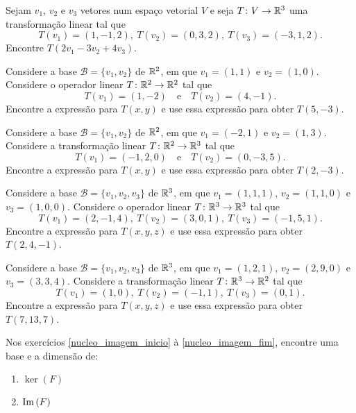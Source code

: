 \documentclass[12pt]{exam}
\begin{document}
\begin{exercicio}
    Sejam $v_1$, $v_2$ e $v_3$ vetores num espaço vetorial $V$ e seja $T \colon V \to \mathbb{R}^3$ uma transformação linear tal que
    \[
        T(v_1) = (1, -1, 2), \ T(v_2) = (0, 3, 2), \ T(v_3) = (-3, 1, 2).
    \]
    Encontre $T(2v_1 - 3v_2 + 4v_3)$.
\end{exercicio}

\begin{exercicio}
    Considere a base $\mathcal{B} = \{v_1, v_2\}$ de $\mathbb{R}^2$, em que $v_1 = (1, 1)$ e $v_2 = (1, 0)$. Considere o operador linear $T \colon \mathbb{R}^2 \to \mathbb{R}^2$ tal que
    \[
        T(v_1) = (1, -2)\quad \mbox{e} \quad T(v_2) = (4, -1).
    \]
    Encontre a expressão para $T(x, y)$ e use essa expressão para obter $T(5, -3)$.
\end{exercicio}

\begin{exercicio}
    Considere a base $\mathcal{B} = \{v_1, v_2\}$ de $\mathbb{R}^2$, em que $v_1 = (-2, 1)$ e $v_2 = (1, 3)$. Considere a transformação linear $T \colon \mathbb{R}^2 \to \mathbb{R}^3$ tal que
    \[
        T(v_1) = (-1, 2, 0)\quad \mbox{e} \quad T(v_2) = (0, -3, 5).
    \]
    Encontre a expressão para $T(x, y)$ e use essa expressão para obter $T(2, -3)$.
\end{exercicio}

\begin{exercicio}
    Considere a base $\mathcal{B} = \{v_1, v_2, v_3\}$ de $\mathbb{R}^3$, em que $v_1 = (1, 1, 1)$, $v_2 = (1, 1, 0)$ e $v_3 = (1, 0, 0)$. Considere o operador linear $T \colon \mathbb{R}^3 \to \mathbb{R}^3$ tal que
    \[
        T(v_1) = (2, -1, 4),\ T(v_2) = (3, 0, 1),\ T(v_3) = (-1, 5, 1).
    \]
    Encontre a expressão para $T(x, y, z)$ e use essa expressão para obter $T(2, 4, -1)$.
\end{exercicio}

\begin{exercicio}
    Considere a base $\mathcal{B} = \{v_1, v_2, v_3\}$ de $\mathbb{R}^3$, em que $v_1 = (1, 2, 1)$, $v_2 = (2, 9, 0)$ e $v_3 = (3, 3, 4)$. Considere a transformação linear $T \colon \mathbb{R}^3 \to \mathbb{R}^2$ tal que
    \[
        T(v_1) = (1, 0),\ T(v_2) = (-1, 1),\ T(v_3) = (0, 1).
    \]
    Encontre a expressão para $T(x, y, z)$ e use essa expressão para obter $T(7, 13, 7)$.
\end{exercicio}

Nos exercícios \eqref{nucleo_imagem_inicio} à \eqref{nucleo_imagem_fim}, encontre uma base e a dimensão de:
\begin{enumerate}[label={\alph*})]
    \item $\ker(F)$

    \item ${\rm Im\,}(F)$
\end{enumerate}
\end{document}

